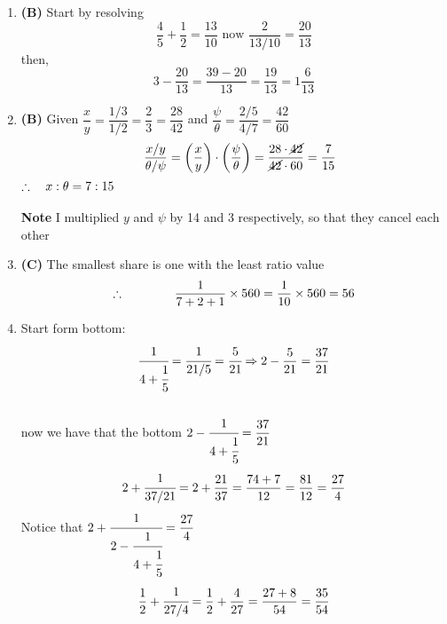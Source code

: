 \begin{multicols}{2}
\begin{enumerate}[label={\textbf{\arabic*.}}]
    \item \textbf{(B)} Start by resolving \\
    \[ \dfrac{4}{5} + \dfrac{1}{2} = \dfrac{13}{10}\text{ now }  \dfrac{2}{13/10} = \dfrac{20}{13} \] 
    then, \\
    \[3 - \dfrac{20}{13} = \dfrac{39 - 20}{13} = \dfrac{19}{13} = 1\dfrac{6}{13} \]
    \item \textbf{(B)} Given $\dfrac{x}{y} = \dfrac{1/3}{1/2} = \dfrac{2}{3} = \dfrac{28}{42}$ and $\dfrac{\psi}{\theta} = \dfrac{2/5}{4/7} = \dfrac{42}{60}$ \\
    \[ \hspace{10px} \dfrac{x/y}{\theta / \psi} = \left(\dfrac{x}{y}\right) \cdot \left(\dfrac{\psi}{\theta}\right) = \dfrac{28 \cdot \cancel{42}}{\cancel{42} \cdot 60} = \dfrac{7}{15}  \]
    \(\therefore \hspace{10px} x:\theta = 7:15\) \\\\
    \textbf{Note} I multiplied $y$ and $\psi$ by 14 and 3 respectively, so that they cancel each other

    \item \textbf{(C)} The smallest share is one with the least ratio value \\
    \[ \therefore \hspace{40px} \dfrac{1}{7+2+1} \times 560 = \dfrac{1}{10} \times 560 = 56\]
    \item Start form bottom: \\
    \[\cfrac{1}{4 + \cfrac{1}{5}}  = \cfrac{1}{ 21/5} = \cfrac{5}{21} \Rightarrow 2 - \dfrac{5}{21} = \dfrac{37}{21}\] \\
    now we have that the bottom \(2 - \cfrac{1}{4 + \cfrac{1}{5}} = \dfrac{37}{21}\) \vspace{3pt}
    \[2 + \cfrac{ 1 }{37/21} = 2 + \dfrac{21}{37}  = \dfrac{74 + 7}{12} = \dfrac{81}{12} = \dfrac{27}{4}\]
    Notice that \(2 + \cfrac{1}{2 - \cfrac{1}{4 + \cfrac{1}{5}}} = \dfrac{27}{4}\) \vspace{3pt}
    \[\dfrac{1}{2} + \cfrac{1}{27/4} = \dfrac{1}{2} + \dfrac{4}{27} = \dfrac{27 + 8}{54} = \dfrac{35}{54} \]


\end{enumerate}
\end{multicols}
